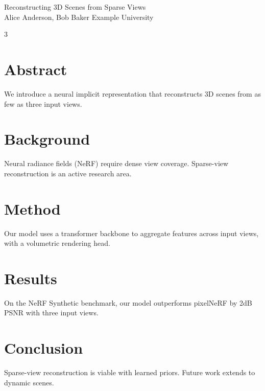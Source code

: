\documentclass[portrait,a0paper,fontscale=0.3]{a0poster}
\begin{document}
\begin{center}
  {\VeryHuge Reconstructing 3D Scenes from Sparse Views}\\[0.5cm]
  {\Large Alice Anderson, Bob Baker \hspace{1cm} Example University}
\end{center}

\begin{multicols}{3}

\section*{Abstract}
We introduce a neural implicit representation that reconstructs 3D scenes from as few as three input views.

\section*{Background}
Neural radiance fields (NeRF) require dense view coverage. Sparse-view reconstruction is an active research area.

\section*{Method}
Our model uses a transformer backbone to aggregate features across input views, with a volumetric rendering head.

\section*{Results}
On the NeRF Synthetic benchmark, our model outperforms pixelNeRF by 2dB PSNR with three input views.

\section*{Conclusion}
Sparse-view reconstruction is viable with learned priors. Future work extends to dynamic scenes.

\end{multicols}
\end{document}
